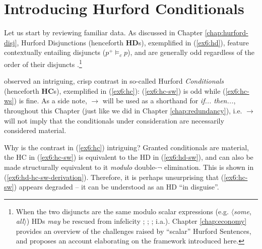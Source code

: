 \section{Introducing Hurford Conditionals}

Let us start by reviewing familiar data. As discussed in Chapter \ref{chap:hurford-disj}, Hurford Disjunctions (henceforth \textbf{HD}s), exemplified in (\ref{ex6:hd}), feature contextually entailing disjuncts ($p^+ \vDash_c p$), and are generally odd regardless of the order of their disjuncts \citep{Hurford1974}.\footnote{When the two disjuncts are the same modulo scalar expressions (e.g. $\langle$\textit{some}, \textit{all}$\rangle$) HDs \textit{may} be rescued from infelicity ; ; ;  i.a.). Chapter \ref{chap:economy} provides an overview of the challenges raised by ``scalar'' Hurford Sentences, and proposes an account elaborating on the framework introduced here.}

\begin{exe}
	\ex \label{ex6:hd}
	\begin{xlist}
		\label{ex6:hd-sw}
		\label{ex6:hd-ws}
	\end{xlist}
\end{exe}

\citet{Mandelkern2018} observed an intriguing, crisp contrast in so-called Hurford \textit{Conditionals} (henceforth \textbf{HC}s), exemplified in (\ref{ex6:hc}): (\ref{ex6:hc-sw}) is odd while (\ref{ex6:hc-ws}) is fine. As a side note, $\rightarrow$ will be used as a shorthand for \textit{if... then...}, throughout this Chapter (just like we did in Chapter \ref{chap:redundancy}), i.e. $\rightarrow$ will not imply that the conditionals under consideration are necessarily considered material.

\begin{exe}
	\ex \label{ex6:hc}
	\begin{xlist}
		\label{ex6:hc-sw}
		\label{ex6:hc-ws}
	\end{xlist}
\end{exe}

Why is the contrast in (\ref{ex6:hc}) intriguing? Granted conditionals are material, the HC in (\ref{ex6:hc-sw}) is equivalent to the HD in (\ref{ex6:hd-sw}), and can also be made structurally equivalent to it \textit{modulo} double-$\neg$ elimination. This is shown in (\ref{ex6:hd-hc-sw-derivation}). Therefore, it is perhaps unsurprising that (\ref{ex6:hc-sw}) appears degraded -- it can be understood as an HD ``in disguise''.

